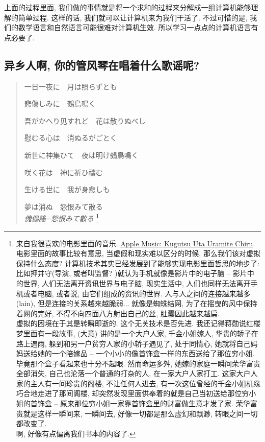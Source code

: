 上面的过程里面, 我们做的事情就是将一个求和的过程来分解成一组计算机能够理解的简单过程. 这样的话, 我们就可以让计算机来为我们干活了. 不过可惜的是, 我们的数学语言和自然语言可能很难对计算机生效. 所以学习一点点的计算机语言有点必要了. 

\subsection{异乡人啊, 你的管风琴在唱着什么歌谣呢? }
\begin{quotation}
一日一夜に　月は照らずとも

悲傷しみに　鵺鳥鳴く

吾がかへり见すれど　花は散りぬべし

慰むる心は　消ぬるがごとく

新世に神集ひて　夜は明け鵺鳥鳴く

咲く花は　神に祈ひ禱む

生ける世に　我が身悲しも

夢は消ぬ　怨恨みて散る
\\
\emph{傀儡謠─怨恨みて散る} \footnote{来自我很喜欢的电影里面的音乐. \href{https://music.apple.com/cn/album/kugutsu-uta-uramite-chiru/1547968823}{Apple Music: Kugutsu Uta Uramite Chiru}. \\电影里面的故事比较有意思, 当虚假和现实难以区分的时候, 那么我们该对虚拟保持什么态度? 计算机技术其实已经发展到了能够实现电影里面哲思的地步了: 比如押井守(导演, 或者叫监督? )就认为手机就像是影片中的电子脑 -- 影片中的世界, 人们无法离开资讯世界与电子脑, 现实生活中, 人们也同样无法离开手机或者电脑, 或者说, 由它们组成的资讯的世界. 人与人之间的连接越来越多(lain), 但是连接的关系越来越脆弱... 就像是蜘蛛结网, 为了在摇曳的风中保持着网的完好, 不得不向四面八方射出自己的丝, 肚囊因此越来越扁. \\虚拟的困境在于其是转瞬即逝的. 这个无关技术是否先进. 我还记得蒋勋说红楼梦里面有一段故事, (大意) 讲的是一个大户人家, 千金小姐嫁人, 华贵的轿子在路上遇雨, 躲到和另一户贫穷人家的小轿子遇见了, 处于同情心, 她就将自己妈妈送给她的一个陪嫁品 -- 一个小小的像首饰盒一样的东西送给了那位穷小姐. 毕竟那个盒子看起来也十分不起眼. 然而命运多舛, 她嫁的家庭一瞬间荣华富贵全部消失, 自己也沦落一个普通的打杂的人, 在一家大户人家打工. 这家大户人家的主人有一间珍贵的阁楼, 不让任何人进去, 有一次这位曾经的千金小姐机缘巧合地走进了那间阁楼, 却突然发现里面供奉着的就是自己当初送给那位穷小姐的首饰盒 -- 原来那位穷小姐一家靠首饰盒里的财富做生意才发了家. 荣华富贵就是这样一瞬间来, 一瞬间去, 好像一切都是那么虚幻和飘渺, 转眼之间一切都改变了. \\啊, 好像有点偏离我们书本的内容了. }
\end{quotation}

